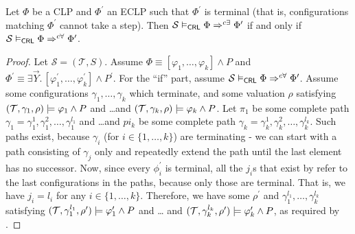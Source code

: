 \begin{lemma}\label{crlOPAPcorrespondence}
    Let $\Phi$ be a CLP and $\Phi^\prime$ an ECLP such that $\Phi^\prime$ is terminal
    (that is, configurations matching $\Phi^\prime$ cannot take a step).
    Then $\mathcal{S} \vDash_{\mathsf{CRL}} \Phi \Rightarrow^{c\exists} \Phi^\prime$
    if and only if $\mathcal{S} \vDash_{\mathsf{CRL}} \Phi \Rightarrow^{c\forall} \Phi^\prime$.
\end{lemma}
\begin{proof}
Let $\mathcal{S} = (\mathcal{T}, S)$.
Assume $\Phi \equiv [\varphi_1,\ldots,\varphi_k] \land P$
and $\Phi^\prime \equiv \exists \vec{Y}.\, [\varphi^\prime_1,\ldots,\varphi^\prime_k] \land P^\prime$.
For the ``if'' part, assume $\mathcal{S} \vDash_{\mathsf{CRL}} \Phi \Rightarrow^{c\forall} \Phi^\prime$.
Assume some configurations $\gamma_1,\ldots,\gamma_k$ which terminate, and some valuation $\rho$
satisfying $(\mathcal{T}, \gamma_1,\rho) \models \varphi_1 \land P$ and \ldots and $(\mathcal{T}, \gamma_k,\rho) \models \varphi_k \land P$.
Let $\pi_1$ be some complete path $\gamma_1 = \gamma_1^1,\gamma_1^2,\ldots,\gamma_1^{l_1}$
and \ldots and $pi_k$ be some complete path $\gamma_k = \gamma_k^1,\gamma_k^2,\ldots,\gamma_k^{l_k}$.
Such paths exist, because $\gamma_i$ (for $i \in \{1, \ldots, k \}$) are terminating
- we can start with a path consisting of $\gamma_j$ only and repeatedly extend the path until the last element has no successor.
Now, since every $\phi_i^\prime$ is terminal, all the $j_i$s that exist by 
refer to the last configurations in the paths, because only those are terminal.
That is, we have $j_i = l_i$ for any $i \in \{ 1, \ldots, k \}$.
Therefore, we have some $\rho^\prime$ and $\gamma_1^{l_1}, \ldots, \gamma_k^{l_k}$ satisfying
$(\mathcal{T}, \gamma_1^{l_1}, \rho^\prime) \models \varphi^\prime_1 \land P$ and \ldots
and $(\mathcal{T}, \gamma_k^{l_k}, \rho^\prime) \models \varphi^\prime_k \land P$,
as required by .


\end{proof}
